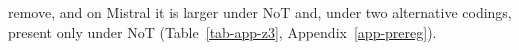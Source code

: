 remove, and on Mistral it is larger under NoT and, under two alternative
codings, present only under NoT (Table~\ref{tab-app-z3},
Appendix~\ref{app-prereg}).
